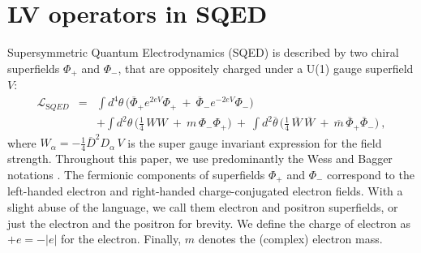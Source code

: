 \documentclass[12pt]{revtex4}
\begin{document}
\section{LV operators in SQED} 
\label{LVoperators}

Supersymmetric Quantum Electrodynamics (SQED) is described
by two chiral superfields $ \Phi_+ $ and $ \Phi_- $, that 
are oppositely charged under a U(1) gauge superfield $ V $: 
\begin{eqnarray}
\mathcal{L}_{\mathrm SQED} & =
&
\int d^4\theta\, \Big(
   \overline{\Phi}_+ e^{2eV} \Phi_+ ~+~
   \overline{\Phi}_- e^{-2eV} {\Phi}_-  \Big) \\
\label{SQED}
&& + 
\int d^2\theta\, \Big( \frac{1}{4}\,  WW ~+~m\, \Phi_-\Phi_+ \Big) ~+~
\int d^2\overline{\theta}\, 
\Big( \frac{1}{4}\, \overline{W}\,\overline{W} ~+~ 
\overline{m}\, \overline{\Phi}_+\overline{\Phi}_- \Big)~, 
\nonumber
\end{eqnarray}
where $ W_\alpha = - \frac{1}{4} \overline{D}^2 D_\alpha\, {V} $ 
is the super gauge invariant expression for the field strength. 
Throughout this paper, we use predominantly the Wess and
Bagger notations \cite{Wess:1992cp}. The fermionic components of
superfields $ \Phi_+ $ and $ \Phi_- $ correspond to the left-handed
electron and right-handed charge-conjugated electron fields. With a   
slight abuse of the language, we call them electron and positron 
superfields, or just the electron and the positron for brevity. We
define the charge of electron as $ + e = - | e | $ for the
electron. Finally, $m$ denotes the (complex) electron mass. 
\end{document}
